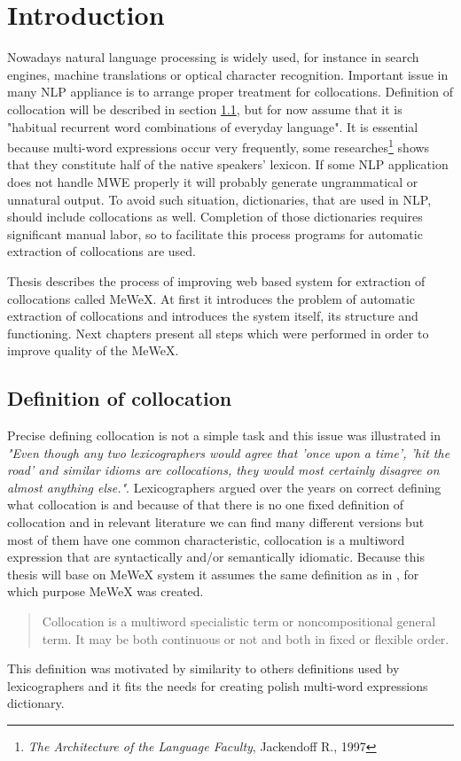 
\chapter{Introduction}

Nowadays natural language processing is widely used, for instance in search engines, machine translations or optical character recognition.
Important issue in many NLP appliance is to arrange proper treatment for collocations. Definition of collocation will be described in 
section \ref{col_def}, but for now assume that it is "habitual recurrent word combinations of everyday language"\cite{ramisch}.
It is essential because multi-word expressions occur very frequently, some researches\footnote{
\textit{The Architecture of the Language Faculty}, Jackendoff R., 1997} shows that they constitute half of the native speakers' lexicon.
If some NLP application does not handle MWE properly it will probably generate ungrammatical or unnatural output.
To avoid such situation, dictionaries, that are used in NLP, should include collocations as well. Completion of those dictionaries 
requires significant manual labor, so to facilitate this process programs for automatic extraction of collocations are used.

Thesis describes the process of improving web based system for extraction of collocations called MeWeX. 
At first it introduces the problem of automatic extraction of collocations and introduces the system itself, 
its structure and functioning. Next chapters present all steps which were performed in order to improve quality of the MeWeX.

\section{Definition of collocation}\label{col_def}
Precise defining collocation is not a simple task and this issue was illustrated in \cite{evert} 
\textit{"Even though any two lexicographers would agree that ’once upon a time’, ’hit the road’ and similar idioms are collocations,
they would most certainly disagree on almost anything else."}.
Lexicographers argued over the years on correct defining what collocation is and because of that there is no one fixed definition of collocation  
and in relevant literature we can find many different versions but most of them have one common characteristic, 
collocation is a multiword expression that are syntactically and/or semantically idiomatic. Because this thesis will base on MeWeX system 
it assumes the same definition as in \cite{mgr}, for which purpose MeWeX was created.
\begin{quote}
    Collocation is a multiword specialistic term or noncompositional general term. 
    It may be both continuous or not and both in fixed or flexible order.
\end{quote}
This definition was motivated by similarity to others definitions used by lexicographers and it fits the needs for creating polish multi-word expressions dictionary. 


